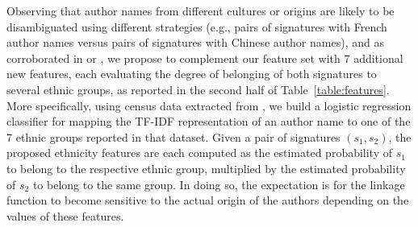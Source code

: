 \documentclass{article}
\begin{document}
Observing that author names from different cultures or origins are likely to be
disambiguated using different strategies (e.g., pairs of signatures with French
author names versus pairs of signatures with Chinese author names), and as
corroborated in \citep{treeratpituk2012name} or \citep{chin2014effective}, we
propose to complement our feature set with 7 additional new features, each
evaluating the degree of belonging of both signatures to several ethnic groups,
as reported in the second half of Table~\ref{table:features}. More
specifically, using census data extracted from \citep{rugglesintegrated}, we
build a logistic regression classifier for mapping the TF-IDF representation of
an author name to one of the 7 ethnic groups reported in that dataset. Given a
pair of signatures $(s_1, s_2)$, the proposed ethnicity features are each
computed as the estimated probability of $s_1$ to belong to the respective
ethnic group, multiplied by the estimated probability of $s_2$ to belong to the
same group. In doing so, the expectation is for the linkage function to become
sensitive to the actual origin of the authors depending on the values of these
features.
\end{document}
